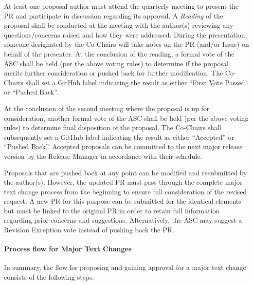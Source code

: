 \documentclass{article}
\begin{document}
At least one proposal author must attend the quarterly meeting to
present the PR and participate in discussion regarding its approval. A
\textit{Reading} of the proposal shall be conducted at the meeting with the
author(s) reviewing any questions/concerns raised and how they were
addressed. During the presentation, someone designated by the Co-Chairs
will take notes on the PR (and/or Issue) on behalf of the presenter.
At the conclusion of the reading, a formal vote of the ASC shall be held
(per the above voting rules) to determine if the proposal merits further
consideration or pushed back for further modification.
The Co-Chairs shall set a GitHub label indicating the
result as either ``First Vote Passed' or ``Pushed Back''.

At the conclusion of the second meeting where the proposal is up for
consideration, another formal vote of the ASC shall be held (per the
above voting rules) to determine final disposition of the proposal. The
Co-Chairs shall subsequently set a GitHub label indicating the result as
either ``Accepted'' or ``Pushed Back''. Accepted
proposals can be committed to the next major release version by the
Release Manager in accordance with their schedule.

Proposals that are pushed back at any point can be modified and
resubmitted by the author(s). However, the updated PR must pass through
the complete major text change process from the beginning to ensure full
consideration of the revised request. A new PR for this purpose can be
submitted for the identical elements but must be linked to the original
PR in order to retain full information regarding prior concerns and
suggestions. Alternatively, the ASC may suggest a Revision Exception vote
instead of pushing back the PR.

\hypertarget{process-flow-for-major-text-changes}{%
\paragraph{Process flow for Major Text Changes}%
\label{process-flow-for-major-text-changes}}

In summary, the flow for proposing and gaining approval for a major text
change consists of the following steps:
\end{document}
